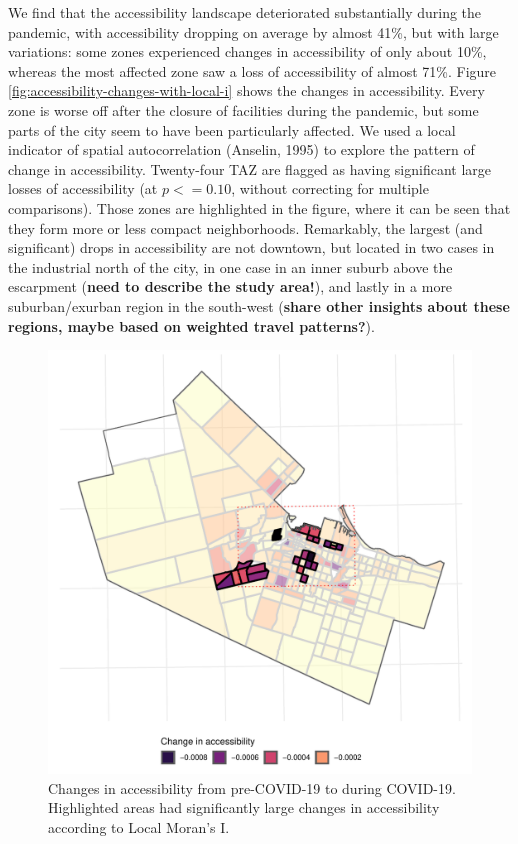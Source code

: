 \documentclass[]{elsarticle} %
\begin{document}
We find that the accessibility landscape deteriorated substantially
during the pandemic, with accessibility dropping on average by almost
41\%, but with large variations: some zones experienced changes in
accessibility of only about 10\%, whereas the most affected zone saw a
loss of accessibility of almost 71\%. Figure
\ref{fig:accessibility-changes-with-local-i} shows the changes in
accessibility. Every zone is worse off after the closure of facilities
during the pandemic, but some parts of the city seem to have been
particularly affected. We used a local indicator of spatial
autocorrelation (Anselin, 1995) to explore the pattern of change in
accessibility. Twenty-four TAZ are flagged as having significant large
losses of accessibility (at \(p<=0.10\), without correcting for multiple
comparisons). Those zones are highlighted in the figure, where it can be
seen that they form more or less compact neighborhoods. Remarkably, the
largest (and significant) drops in accessibility are not downtown, but
located in two cases in the industrial north of the city, in one case in
an inner suburb above the escarpment (\textbf{need to describe the study
area!}), and lastly in a more suburban/exurban region in the south-west
(\textbf{share other insights about these regions, maybe based on
weighted travel patterns?}).

\begin{figure}
\includegraphics[width=1\linewidth]{Accessibility-Foodbanks-Hamilton_files/figure-latex/plot-local-i-1} \caption{\label{fig:accessibility-changes-with-local-i}Changes in accessibility from pre-COVID-19 to during COVID-19. Highlighted areas had significantly large changes in accessibility according to Local Moran's I.}\label{fig:plot-local-i}
\end{figure}
\end{document}
